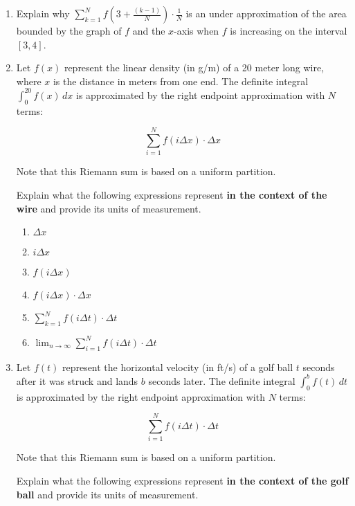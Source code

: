 \documentclass[12pt]{report}
\begin{document}
\begin{enumerate}
\item Explain why $\sum_{k=1}^N f\left(3+\frac{(k-1)}{N}\right)\cdot\frac{1}{N}$ is an under approximation of the area bounded by the graph of $f$ and the $x$-axis when $f$ is increasing on the interval $[3, 4]$.


\item Let $f(x)$ represent the linear density (in g/m) of a 20 meter long wire, where $x$ is the distance in meters from one end. The definite integral $\int_0^{20} f(x)\,dx$ is approximated by the right endpoint approximation with $N$ terms:

$$\sum_{i=1}^N f(i\Delta x)\cdot \Delta x$$

Note that this Riemann sum is based on a uniform partition.

Explain what the following expressions represent {\bf in the context of the wire} and provide its units of measurement. 

\begin{enumerate}

\item $\Delta x$

\item $i\Delta x$

\item $f(i\Delta x)$

\item $f(i\Delta x)\cdot \Delta x$

\item $\sum_{k=1}^Nf(i\Delta t)\cdot \Delta t$

\item $\lim_{n\rightarrow \infty}\sum_{i=1}^Nf(i\Delta t)\cdot \Delta t$

\end{enumerate}

\item Let $f(t)$ represent the horizontal velocity (in ft/s) of a golf ball $t$ seconds after it was struck and lands $b$ seconds later. The definite integral $\int_0^b f(t)\,dt$ is approximated by the right endpoint approximation with $N$ terms:

$$\sum_{i=1}^N f(i\Delta t)\cdot \Delta t$$

Note that this Riemann sum is based on a uniform partition.

Explain what the following expressions represent {\bf in the context of the golf ball} and provide its units of measurement. 

\begin{enumerate}


\end{enumerate}
\end{enumerate}
\end{document}
